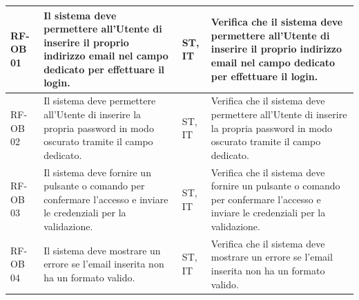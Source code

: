 \documentclass[a4paper,11pt,oneside]{scrartcl}
\begin{document}
\begin{longtable}{|p{1.5cm}|p{4.5cm}|p{1.8cm}|p{6cm}|}
    RF-OB 01         & Il sistema deve permettere all'Utente di inserire il proprio indirizzo email nel campo dedicato per effettuare il login.                                                                                                                                                                              & ST, IT             & Verifica che il sistema deve permettere all'Utente di inserire il proprio indirizzo email nel campo dedicato per effettuare il login.                                                                                                                                                                              \\ \hline
    RF-OB 02         & Il sistema deve permettere all'Utente di inserire la propria password in modo oscurato tramite il campo dedicato.                                                                                                                                                                                     & ST, IT             & Verifica che il sistema deve permettere all'Utente di inserire la propria password in modo oscurato tramite il campo dedicato.                                                                                                                                                                                     \\ \hline
    RF-OB 03         & Il sistema deve fornire un pulsante o comando per confermare l'accesso e inviare le credenziali per la validazione.                                                                                                                                                                                   & ST, IT             & Verifica che il sistema deve fornire un pulsante o comando per confermare l'accesso e inviare le credenziali per la validazione.                                                                                                                                                                                   \\ \hline
    RF-OB 04         & Il sistema deve mostrare un errore se l'email inserita non ha un formato valido.                                                                                                                                                                                                                      & ST, IT             & Verifica che il sistema deve mostrare un errore se l'email inserita non ha un formato valido.                                                                                                                                                                                                                      \\ \hline

\end{longtable}
\end{document}

